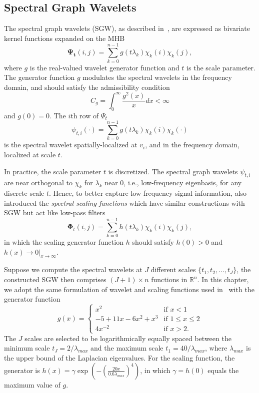 \subsection{Spectral Graph Wavelets}
\label{sec:sgw}

The spectral graph wavelets (SGW), as described
in~\cite{Hammond2011}, are expressed as bivariate kernel
functions expanded on the MHB
\begin{equation}
\mathbf{\Psi_t}(i,j)=\sum_{k=0}^{n-1}g(t\lambda_k)\chi_k(i)\chi_k(j),
\end{equation}
where $g$ is the real-valued wavelet generator function and $t$ is the
scale parameter. The generator function $g$ modulates the spectral
wavelets in the frequency domain, and should satisfy the admissibility
condition
\begin{equation}
C_g=\int_0^{\infty}\frac{g^2(x)}{x}dx < \infty
\end{equation}
and $g(0)=0$. The $i$th row of $\Psi_t$
\begin{equation}
\psi_{t,i}(\cdot)=\sum_{k=0}^{n-1} g(t\lambda_k)\chi_k(i)\chi_k(\cdot)
\end{equation}
is the spectral wavelet spatially-localized at $v_i$, and in the
frequency domain, localized at scale $t$.

In practice, the scale parameter $t$ is discretized. The
spectral graph wavelets $\psi_{t,i}$ are near orthogonal to
$\chi_k$ for $\lambda_k$ near 0, i.e., low-frequency eigenbasis,
for any discrete scale $t$. Hence, to better capture low-frequency signal
information, \cite{Hammond2011} also introduced the \emph{spectral
scaling functions} which have similar constructions with SGW but act like low-pass filters
\begin{equation}
  \mathbf{\Phi}_t(i,j)=\sum_{k=0}^{n-1} h(t\lambda_k)\chi_k(i)\chi_k(j),
\end{equation}
in which the scaling generator function $h$ should satisfy $h(0)>0$
and $h(x)\rightarrow 0|_{x\rightarrow\infty}$.

Suppose we compute the spectral wavelets at $J$ different scales
$\{t_1,t_2,\ldots,t_J\}$, the constructed SGW then comprises
$(J+1)\times n$ functions in $\mathbb{R}^n$. In this chapter, we adopt
the same formulation of wavelet and scaling functions used
in~\cite{Hammond2011} with the generator function
\begin{equation}
g(x)=
\begin{cases}
        x^2 & \text{if } x<1\\
        -5+11x-6x^2+x^3 & \text{if } 1\leq x \leq 2\\
        4x^{-2} & \text{if } x>2.
    \end{cases}
\end{equation}
The $J$ scales are selected to be logarithmically equally spaced
between the minimum scale $t_J=2/\lambda_{max}$ and the maximum scale
$t_1=40/\lambda_{max}$, where $\lambda_{max}$ is the upper bound of
the Laplacian eigenvalues. For the scaling function, the generator is
$h(x)=\gamma\exp(-(\frac{20x}{0.6\lambda_{max}})^4)$, in which
$\gamma=h(0)$ equals the maximum value of $g$.

